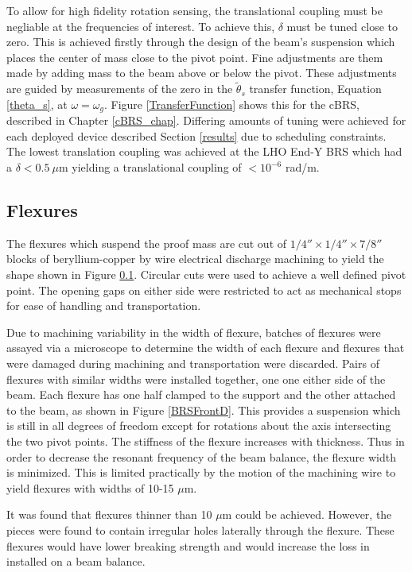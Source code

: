 \documentclass [12pt, proquest]{uwthesis}[2019]
\begin{document}
To allow for high fidelity rotation sensing, the translational coupling must be negliable at the frequencies of interest. To achieve this, $\delta$ must be tuned close to zero. This is achieved firstly through the design of the beam's suspension which places the center of mass close to the pivot point. Fine adjustments are them made by adding mass to the beam above or below the pivot. These adjustments are guided by measurements of the zero in the $\tilde{\theta}_s$ transfer function, Equation \ref{theta_s}, at $\omega=\omega_g$. Figure \ref{TransferFunction} shows this for the cBRS, described in Chapter \ref{cBRS_chap}. Differing amounts of tuning were achieved for each deployed device described Section \ref{results} due to scheduling constraints. The lowest translation coupling was achieved at the LHO End-Y BRS which had a $\delta<0.5\ \mu$m yielding a translational coupling of $<10^{-6}$ rad/m.

\subsection{Flexures}\label{flex}

The flexures which suspend the proof mass are cut out of $1/4''\times1/4''\times7/8''$ blocks of beryllium-copper by wire electrical discharge machining to yield the shape shown in Figure \ref{flex}. Circular cuts were used to achieve a well defined pivot point. The opening gaps on either side were restricted to act as mechanical stops for ease of handling and transportation.

Due to machining variability in the width of flexure, batches of flexures were assayed via a microscope to determine the width of each flexure and flexures that were damaged during machining and transportation were discarded. Pairs of flexures with similar widths were installed together, one one either side of the beam. Each flexure has one half clamped to the support and the other attached to the beam, as shown in Figure \ref{BRSFrontD}. This provides a suspension which is still in all degrees of freedom except for rotations about the axis intersecting the two pivot points. The stiffness of the flexure increases with thickness. Thus in order to decrease the resonant frequency of the beam balance, the flexure width is minimized. This is limited practically by the motion of the machining wire to yield flexures with widths of 10-15 $\mu$m.

It was found that flexures thinner than 10 $\mu$m could be achieved. However, the pieces were found to contain irregular holes laterally through the flexure. These flexures would have lower breaking strength and would increase the loss in installed on a beam balance. 
\end{document}
